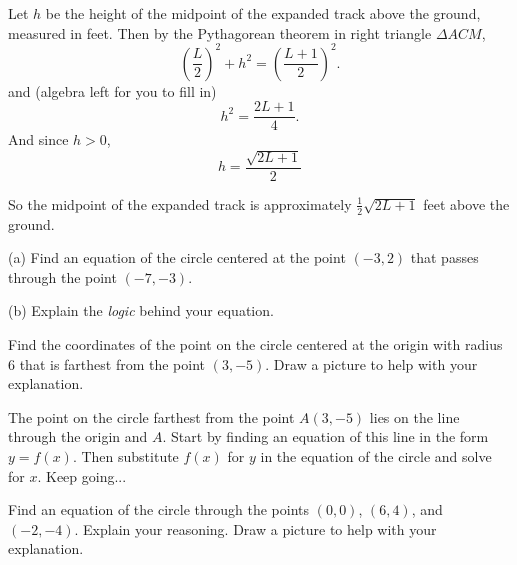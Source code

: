 \documentclass{ximera}
\begin{document}
\begin{question}
\begin{explanation}
Let $h$ be the height of the midpoint of the expanded track above the ground, measured in feet. Then by the Pythagorean theorem in right triangle $\Delta ACM$,
\[
    \left(  \frac{L}{2} \right)^2  + h^2 =    \left( \frac{L+1}{2} \right)^2 .
\]
and (algebra left for you to fill in)
\[
      h^2 = \frac{2L+1}{4} .
\]
And since $h>0$,
\[
    h = \frac{\sqrt{2L+1}}{2}
\]

So the midpoint of the expanded track is approximately $\frac{1}{2}\sqrt{2L+1}$ feet above the ground.

\end{explanation}


\end{question}


\begin{question}  \label{Q8dsf8r3tg;lyhg}
(a) Find an equation of the circle centered at the point $(-3,2)$ that passes through the point $(-7,-3)$. 

(b) Explain the \emph{logic} behind your equation. 
\end{question}



\begin{question}  \label{Q:df454tt4443}
Find the coordinates of the point on the circle centered at the origin with radius $6$ that is farthest from the point $(3,-5)$. Draw a picture to help with your explanation.

\begin{hint}
The point on the circle farthest from the point $A(3,-5)$ lies on the line through the origin and $A$. Start by finding an equation of this line in the form $y=f(x)$. Then substitute $f(x)$ for $y$ in the equation of the circle and solve for $x$. Keep going...
\end{hint}

\end{question}

\begin{question} \label{Qsdfl4345r3}
Find an equation of the circle through the points $(0,0)$, $(6,4)$, and $(-2,-4)$. Explain your reasoning. Draw a picture to help with your explanation.

\end{question}





\end{document}
